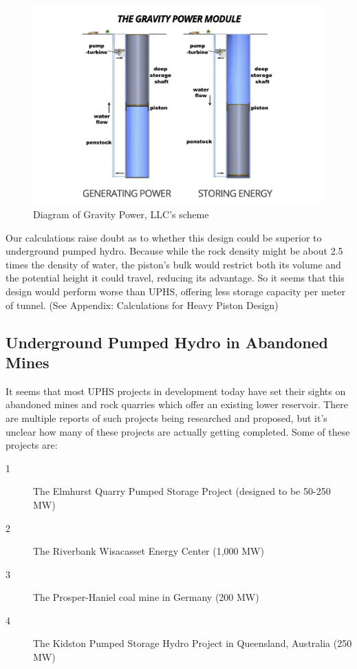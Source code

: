 \documentclass[hidelinks,12pt,a4paper]{article}
\begin{document}
\begin{figure}[ht!]
    \centering
    \includegraphics[width=1\textwidth]{gravity-power-diagram.png}
    \caption{Diagram of Gravity Power, LLC's scheme \cite{GravityPowerTechnologyPage}}
\end{figure}
\FloatBarrier

Our calculations raise doubt as to whether this design could be superior to underground pumped hydro. Because while the rock density might be about 2.5 times the density of water, the piston's bulk would restrict both its volume and the potential height it could travel, reducing its advantage. So it seems that this design would perform worse than UPHS, offering less storage capacity per meter of tunnel. (See Appendix: Calculations for Heavy Piston Design)

\subsection{Underground Pumped Hydro in Abandoned Mines}
It seems that most UPHS projects in development today have set their sights on abandoned mines and rock quarries which offer an existing lower reservoir. There are multiple reports of such projects being researched and proposed, but it's unclear how many of these projects are actually getting completed. Some of these projects are:\cite{SubSurfacePumpedHydroelectricStorage, GermanCoalMineMayBePrimeForPumpedStorage, 250MWKidstonPumpedStorageHydroProject}
{\footnotesize
\begin{description}
    \item[1] The Elmhurst Quarry Pumped Storage Project (designed to be 50-250 MW)
    \item[2] The Riverbank Wisacasset Energy Center (1,000 MW)
    \item[3] The Prosper-Haniel coal mine in Germany (200 MW)
    \item[4] The Kidston Pumped Storage Hydro Project in Queensland, Australia (250 MW)
\end{description}
}
\end{document}
